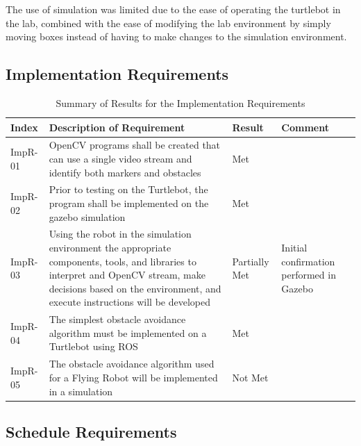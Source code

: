 \documentclass{article}[12]
\begin{document}
The use of simulation was limited due to the ease of operating the turtlebot in the lab, combined with the ease of modifying the lab environment by simply moving boxes instead of having to make changes to the simulation environment.

 \subsection{Implementation Requirements}
 
	\begin{table}[H]
  \small
		\begin{tabular}{p{2cm} p{8cm} p{2cm} p{3cm}}
			\hline
			{\textbf{Index}} & {\textbf{Description of Requirement}} & {\textbf{Result}} & {\textbf{Comment}} \\ \hline 
ImpR-01 & OpenCV programs shall be created that can use a single video stream and identify both markers and obstacles & Met & \\ 
ImpR-02 & Prior to testing on the Turtlebot, the program shall be implemented on the gazebo simulation & Met & \\
ImpR-03 & Using the robot in the simulation environment the appropriate components, tools, and libraries to interpret and OpenCV stream, make decisions based on the environment, and execute instructions will be developed & Partially Met & Initial confirmation performed in Gazebo \\
ImpR-04 & The simplest obstacle avoidance algorithm must be implemented on a Turtlebot using ROS & Met & \\
ImpR-05 & The obstacle avoidance algorithm used for a Flying Robot will be implemented in a simulation & Not Met & \\ \hline
		\end{tabular}
		\caption{Summary of Results for the Implementation Requirements}
		\label{table:impresults}
 \end{table}

 
 \subsection{Schedule Requirements}
\end{document}

